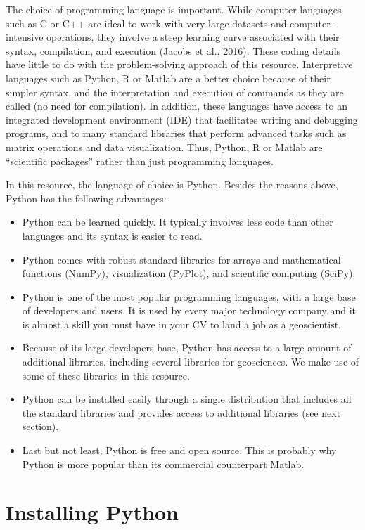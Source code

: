 \documentclass[a4paper , 12pt]{book}
\begin{document}
The choice of programming language is important. While computer languages such as C or C++ are ideal to work with very large datasets and computer-intensive operations, they involve a steep learning curve associated with their syntax, compilation, and execution (Jacobs et al., 2016). These coding details have little to do with the problem-solving approach of this resource. Interpretive languages such as Python, R or Matlab are a better choice because of their simpler syntax, and the interpretation and execution of commands as they are called (no need for compilation). In addition, these languages have access to an integrated development environment (IDE) that facilitates writing and debugging programs, and to many standard libraries that perform advanced tasks such as matrix operations and data visualization. Thus, Python, R or Matlab are “scientific packages” rather than just programming languages.

In this resource, the language of choice is Python. Besides the reasons above, Python has the following advantages:
\begin{itemize}
  \item Python can be learned quickly. It typically involves less code than other languages and its syntax is easier to read.
  \item Python comes with robust standard libraries for arrays and mathematical functions (NumPy), visualization (PyPlot), and scientific computing (SciPy).
  \item Python is one of the most popular programming languages, with a large base of developers and users. It is used by every major technology company and it is almost a skill you must have in your CV to land a job as a geoscientist.
  \item Because of its large developers base, Python has access to a large amount of additional libraries, including several libraries for geosciences. We make use of some of these libraries in this resource.
  \item Python can be installed easily through a single distribution that includes all the standard libraries and provides access to additional libraries (see next section).
  \item Last but not least, Python is free and open source. This is probably why Python is more popular than its commercial counterpart Matlab.
\end{itemize}

\section{Installing Python}
\end{document}
